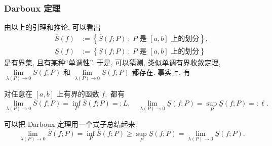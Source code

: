 
\begin{frame}
\frametitle{Darboux 定理}

由以上的引理和推论, 可以看出
\begin{align*}
\overline{S}(f) & := \left\{ \overline{S}(f; P) ~ : ~ P \text{ 是 } [a,b] \text{ 上的划分} \right\}, \\
\underline{S}(f) & := \left\{ \underline{S}(f; P) ~ : ~ P \text{ 是 } [a,b] \text{ 上的划分} \right\}
\end{align*}
是有界集, 且有某种\alert{``单调性''}. 于是, 可以猜测, 类似单调有界收敛定理, $\lim\limits_{\lambda(P) \to 0} \overline{S}(f; P)$ 和 $\lim\limits_{\lambda(P) \to 0} \underline{S}(f; P)$ 都存在. 事实上, 有

\pause
\vspace{1em}

\begin{lem}[Darboux 定理]
对任意在 $[a,b]$ 上有界的函数 $f,$ 都有
\[
\lim_{\lambda(P) \to 0} \overline{S}(f; P) = \inf_P \overline{S}(f; P) =: L, \quad \lim_{\lambda(P) \to 0} \underline{S}(f; P) = \sup_P \underline{S}(f; P) =: \ell.
\]
\end{lem}
可以把 Darboux 定理用一个式子总结起来:
\[
\lim_{\lambda(P) \to 0} \overline{S}(f; P) = \inf_P \overline{S}(f; P) \geqslant \sup_P \underline{S}(f; P) = \lim_{\lambda(P) \to 0} \underline{S}(f; P).
\]

\end{frame}


